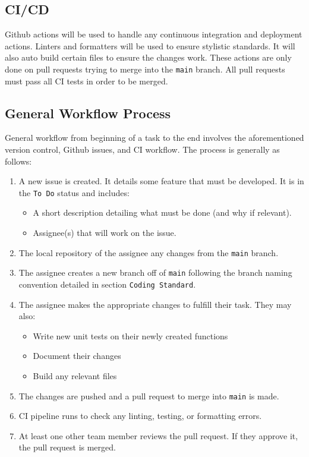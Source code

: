 \documentclass{article}
\begin{document}
\subsection{CI/CD}
Github actions will be used to handle any continuous integration and deployment actions. Linters 
and formatters will be used to ensure stylistic standards. It will also auto build certain files to
ensure the changes work. These actions are only done on pull requests trying to merge into 
the \verb|main| branch. All pull requests must pass all CI tests in order to be merged.

\subsection{General Workflow Process}
General workflow from beginning of a task to the end involves the aforementioned version control, 
Github issues, and CI workflow. The process is generally as follows:

\begin{enumerate}
  \item A new issue is created. It details some feature that must be developed. It is in the
    \verb|To Do| status and includes:
  \begin{itemize}
    \item A short description detailing what must be done (and why if relevant).
    \item Assignee(s) that will work on the issue.
  \end{itemize}

  \item The local repository of the assignee any changes from the \verb|main| branch.
  \item The assignee creates a new branch off of \verb|main| following the branch naming convention
    detailed in section \verb|Coding Standard|.
  \item The assignee makes the appropriate changes to fulfill their task. They may also:
  \begin{itemize}
    \item Write new unit tests on their newly created functions
    \item Document their changes
    \item Build any relevant files
  \end{itemize}

  \item The changes are pushed and a pull request to merge into \verb|main| is made.
  \item CI pipeline runs to check any linting, testing, or formatting errors.
  \item At least one other team member reviews the pull request. If they approve it, the pull
    request is merged.
\end{enumerate}
\end{document}
